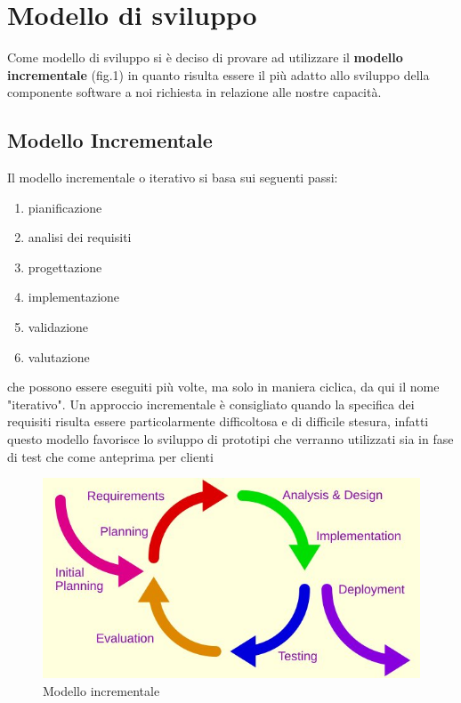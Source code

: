 \section{Modello di sviluppo}
	Come modello di sviluppo si è deciso di provare ad utilizzare il \textbf{modello incrementale} (fig.1) in quanto risulta essere il più adatto allo sviluppo della componente software a noi richiesta in relazione alle nostre capacità. 
	
	\subsection{Modello Incrementale}
		Il modello incrementale o iterativo si basa sui seguenti passi:
		\begin{enumerate}
			\item pianificazione
			\item analisi dei requisiti
			\item progettazione
			\item implementazione
			\item validazione
			\item valutazione
		\end{enumerate}
		che possono essere eseguiti più volte, ma solo in maniera ciclica, da qui il nome "iterativo". Un approccio incrementale è consigliato quando la specifica dei requisiti risulta essere particolarmente difficoltosa e di difficile stesura, infatti questo modello favorisce lo sviluppo di prototipi che verranno utilizzati sia in fase di test che come anteprima per clienti

		\begin{figure}[h!]
			\centering
		    \includegraphics{Iterative_development_model.jpg}
			\caption{Modello incrementale}
		\end{figure}